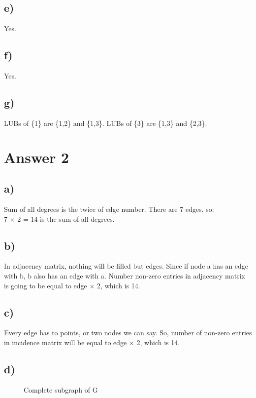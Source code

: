 \documentclass[12pt]{article}
\begin{document}
\subsection*{e)}
Yes.
\subsection*{f)}
Yes.
\subsection*{g)}
LUBs of \{1\} are \{1,2\} and \{1,3\}. LUBs of \{3\} are \{1,3\} and \{2,3\}.
\section*{Answer 2}
\subsection*{a)}
Sum of all degrees is the twice of edge number. There are 7 edges, so:\\
7 $\times$ 2 = 14 is the sum of all degrees.
\subsection*{b)}
In adjacency matrix, nothing will be filled but edges. Since if node a has an edge with b, b also has an edge with a. Number non-zero entries in adjacency matrix is going to be equal to edge $\times$ 2, which is 14.
\subsection*{c)}
Every edge has to points, or two nodes we can say. So, number of non-zero entries in incidence matrix will be equal to edge $\times$ 2, which is 14.
\subsection*{d)}
\begin{figure}[H]
	\centering
	\caption{Complete subgraph of G}	
	\label{fig:g2}
\end{figure}
\end{document}
